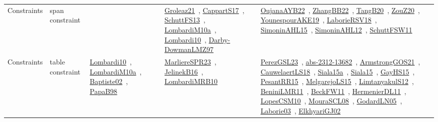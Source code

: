 {\begin{longtable}{lp{3cm}>{\raggedright\arraybackslash}p{6cm}>{\raggedright\arraybackslash}p{6cm}>{\raggedright\arraybackslash}p{8cm}}
Constraints & span constraint &  & \href{../works/Groleaz21.pdf}{Groleaz21}~\cite{Groleaz21}, \href{../works/CappartS17.pdf}{CappartS17}~\cite{CappartS17}, \href{../works/SchuttFS13.pdf}{SchuttFS13}~\cite{SchuttFS13}, \href{../works/LombardiM10a.pdf}{LombardiM10a}~\cite{LombardiM10a}, \href{../works/Lombardi10.pdf}{Lombardi10}~\cite{Lombardi10}, \href{../works/Darby-DowmanLMZ97.pdf}{Darby-DowmanLMZ97}~\cite{Darby-DowmanLMZ97} & \href{../works/OujanaAYB22.pdf}{OujanaAYB22}~\cite{OujanaAYB22}, \href{../works/ZhangBB22.pdf}{ZhangBB22}~\cite{ZhangBB22}, \href{../works/TangB20.pdf}{TangB20}~\cite{TangB20}, \href{../works/ZouZ20.pdf}{ZouZ20}~\cite{ZouZ20}, \href{../works/YounespourAKE19.pdf}{YounespourAKE19}~\cite{YounespourAKE19}, \href{../works/LaborieRSV18.pdf}{LaborieRSV18}~\cite{LaborieRSV18}, \href{../works/SimoninAHL15.pdf}{SimoninAHL15}~\cite{SimoninAHL15}, \href{../works/SimoninAHL12.pdf}{SimoninAHL12}~\cite{SimoninAHL12}, \href{../works/SchuttFSW11.pdf}{SchuttFSW11}~\cite{SchuttFSW11}\\
Constraints & table constraint & \href{../works/Lombardi10.pdf}{Lombardi10}~\cite{Lombardi10}, \href{../works/LombardiM10a.pdf}{LombardiM10a}~\cite{LombardiM10a}, \href{../works/Baptiste02.pdf}{Baptiste02}~\cite{Baptiste02}, \href{../works/PapaB98.pdf}{PapaB98}~\cite{PapaB98} & \href{../works/MarliereSPR23.pdf}{MarliereSPR23}~\cite{MarliereSPR23}, \href{../works/JelinekB16.pdf}{JelinekB16}~\cite{JelinekB16}, \href{../works/LombardiMRB10.pdf}{LombardiMRB10}~\cite{LombardiMRB10} & \href{../works/PerezGSL23.pdf}{PerezGSL23}~\cite{PerezGSL23}, \href{../works/abs-2312-13682.pdf}{abs-2312-13682}~\cite{abs-2312-13682}, \href{../works/ArmstrongGOS21.pdf}{ArmstrongGOS21}~\cite{ArmstrongGOS21}, \href{../works/CauwelaertLS18.pdf}{CauwelaertLS18}~\cite{CauwelaertLS18}, \href{../works/Siala15a.pdf}{Siala15a}~\cite{Siala15a}, \href{../works/Siala15.pdf}{Siala15}~\cite{Siala15}, \href{../works/GayHS15.pdf}{GayHS15}~\cite{GayHS15}, \href{../works/PesantRR15.pdf}{PesantRR15}~\cite{PesantRR15}, \href{../works/MelgarejoLS15.pdf}{MelgarejoLS15}~\cite{MelgarejoLS15}, \href{../works/LimtanyakulS12.pdf}{LimtanyakulS12}~\cite{LimtanyakulS12}, \href{../works/BeniniLMR11.pdf}{BeniniLMR11}~\cite{BeniniLMR11}, \href{../works/BeckFW11.pdf}{BeckFW11}~\cite{BeckFW11}, \href{../works/HermenierDL11.pdf}{HermenierDL11}~\cite{HermenierDL11}, \href{../works/LopesCSM10.pdf}{LopesCSM10}~\cite{LopesCSM10}, \href{../works/MouraSCL08.pdf}{MouraSCL08}~\cite{MouraSCL08}, \href{../works/GodardLN05.pdf}{GodardLN05}~\cite{GodardLN05}, \href{../works/Laborie03.pdf}{Laborie03}~\cite{Laborie03}, \href{../works/ElkhyariGJ02.pdf}{ElkhyariGJ02}~\cite{ElkhyariGJ02}\\
\end{longtable}
}

